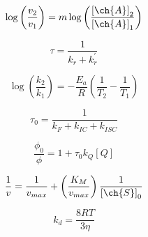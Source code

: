 \documentclass[12pt, letterpaper]{memoir}
\begin{document}
\begin{minipage}[t]{0.5\linewidth}
	\begin{equation*}
		\log\left(\frac{v_2}{v_1}\right)=m\log\left(\frac{\left[\ch{A}\right]_2}{\left[\ch{A}\right]_1}\right)
	\end{equation*}

	\begin{equation*}
		\tau = \dfrac{1}{k_r + k_r^\prime}
	\end{equation*}

	\begin{equation*}
		\log\left(\frac{k_2}{k_1}\right)=-\frac{E_a}{R}\left(\frac{1}{T_2}-\frac{1}{T_1}\right)
	\end{equation*}

	\begin{equation*}
		\tau_0=\dfrac{1}{k_F+k_{IC}+k_{ISC}}
	\end{equation*}

	\begin{equation*}
		\dfrac{\phi_{0}}{\phi} = 1 + \tau_0k_Q[Q]
	\end{equation*}

	\begin{equation*}
		\frac{1}{v}=\frac{1}{v_{max}}+\left(\frac{K_M}{v_{max}}\right)\frac{1}{\left[\ch{S}\right]_0}
	\end{equation*}

	\begin{equation*}
		k_d=\dfrac{8RT}{3\eta}
	\end{equation*}
	
\end{minipage}
\end{document}
